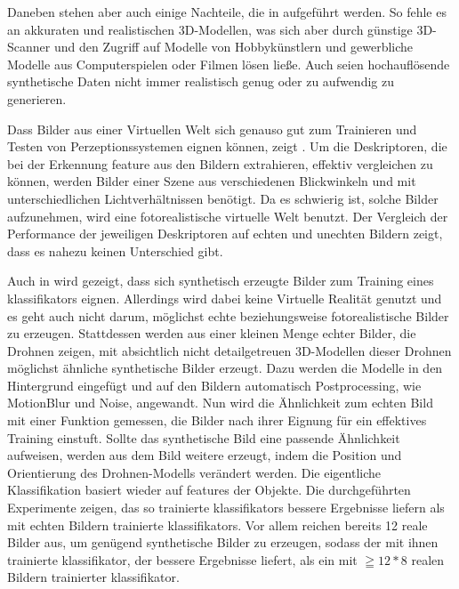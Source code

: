 Daneben stehen aber auch einige Nachteile, die in \cite{heisele} aufgeführt werden. So fehle es an akkuraten und realistischen 3D-Modellen, was sich aber durch günstige 3D-Scanner und den Zugriff auf Modelle von Hobbykünstlern und gewerbliche Modelle aus Computerspielen oder Filmen lösen ließe. Auch seien hochauflösende synthetische Daten nicht immer realistisch genug oder zu aufwendig zu generieren.  \par

Dass Bilder aus einer Virtuellen Welt sich genauso gut zum Trainieren und Testen von Perzeptionssystemen eignen können, zeigt \cite{kaneva}. Um die Deskriptoren, die bei der Erkennung \gls{feature} aus den Bildern extrahieren, effektiv vergleichen zu können, werden Bilder einer Szene aus verschiedenen Blickwinkeln und mit unterschiedlichen Lichtverhältnissen benötigt. Da es schwierig ist, solche Bilder aufzunehmen, wird eine fotorealistische virtuelle Welt benutzt. Der Vergleich der Performance der jeweiligen Deskriptoren auf echten und unechten Bildern zeigt, dass es nahezu keinen Unterschied gibt. \par 

Auch in \cite{synthImg} wird gezeigt, dass sich synthetisch erzeugte Bilder zum Training eines \gls{klassifikator}s eignen. Allerdings wird dabei keine Virtuelle Realität genutzt und es geht auch nicht darum, möglichst echte beziehungsweise fotorealistische Bilder zu erzeugen. Stattdessen werden aus einer kleinen Menge echter Bilder, die Drohnen zeigen, mit absichtlich nicht detailgetreuen 3D-Modellen dieser Drohnen möglichst ähnliche synthetische Bilder erzeugt. Dazu werden die Modelle in den Hintergrund eingefügt und auf den Bildern automatisch Postprocessing, wie MotionBlur und Noise, angewandt. Nun wird die Ähnlichkeit zum echten Bild mit einer Funktion gemessen, die Bilder nach ihrer Eignung für ein effektives Training einstuft. Sollte das synthetische Bild eine passende Ähnlichkeit aufweisen, werden aus dem Bild weitere erzeugt, indem die Position und Orientierung des Drohnen-Modells verändert werden. Die eigentliche Klassifikation basiert wieder auf \glspl{feature} der Objekte. Die durchgeführten Experimente zeigen, das so trainierte \glspl{klassifikator} bessere Ergebnisse liefern als mit echten Bildern trainierte \glspl{klassifikator}. Vor allem reichen bereits 12 reale Bilder aus, um genügend synthetische Bilder zu erzeugen, sodass der mit ihnen trainierte \gls{klassifikator}, der bessere Ergebnisse liefert, als ein mit $\geqq 12 * 8$ realen Bildern trainierter \gls{klassifikator}. \par   

